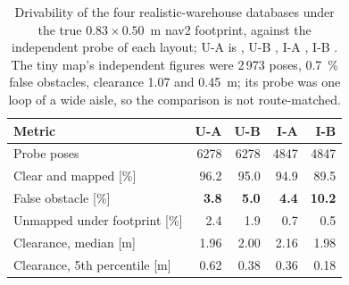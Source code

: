 \documentclass[11pt,a4paper,notitlepage]{report}
\begin{document}
\begin{table}[htbp]
\centering
\caption[Occupied-cell geometry of the four realistic databases.]{Occupied-cell
geometry of the four realistic-warehouse databases
against their world files at \SI{0.25}{\metre} tolerance, beside the tiny map.
Bold marks a value below the fixed criterion.}
\label{tab:map-realistic-geometry}
\small
\setlength{\tabcolsep}{4pt}
\end{table}

\begin{table}[htbp]
\centering
\caption[Drivability of the realistic-warehouse databases under the true nav2
footprint, against independent routes.]{Drivability of the four
realistic-warehouse databases under the true $0.83\times0.50$~m nav2
footprint, against the independent probe of each layout; U-A is
, U-B , I-A
, I-B . The
tiny map's independent figures were 2\,973 poses, \SI{0.7}{\percent} false
obstacles, clearance 1.07 and \SI{0.45}{\metre}; its probe was one loop of a
wide aisle, so the comparison is not route-matched.}
\label{tab:map-realistic-drivability}
\footnotesize
\setlength{\tabcolsep}{4pt}
\begin{tabular}{lrrrr}
\toprule
Metric & U-A & U-B & I-A & I-B \\
\midrule
Probe poses & 6278 & 6278 & 4847 & 4847 \\
Clear and mapped [\si{\percent}] & 96.2 & 95.0 & 94.9 & 89.5 \\
False obstacle [\si{\percent}] & \textbf{3.8} & \textbf{5.0} & \textbf{4.4} & \textbf{10.2} \\
Unmapped under footprint [\si{\percent}] & 2.4 & 1.9 & 0.7 & 0.5 \\
Clearance, median [\si{\metre}] & 1.96 & 2.00 & 2.16 & 1.98 \\
Clearance, 5th percentile [\si{\metre}] & 0.62 & 0.38 & 0.36 & 0.18 \\
\bottomrule
\end{tabular}
\end{table}
\end{document}
